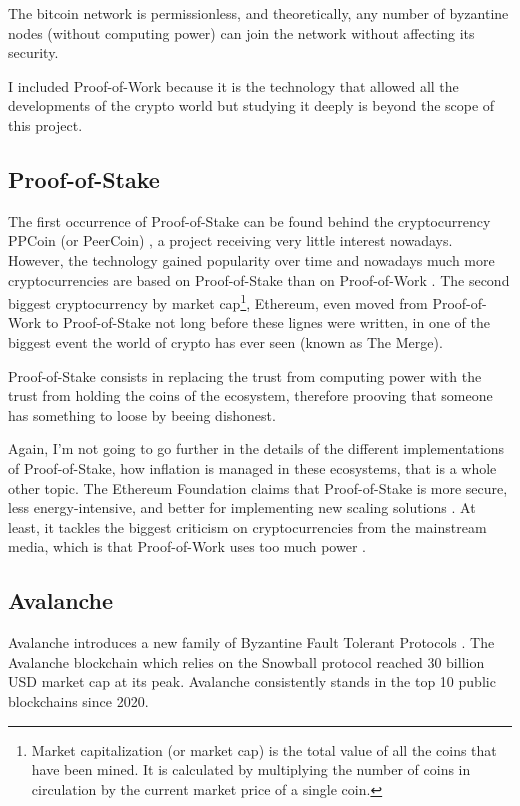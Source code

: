 \documentclass[11pt, twocolumn]{article}
\begin{document}
The bitcoin network is permissionless, and theoretically, any number of byzantine nodes (without computing power) can join the network without affecting its security.

I included Proof-of-Work because it is the technology that allowed all the developments of the crypto world but studying it deeply is beyond the scope of this project.



\subsection{Proof-of-Stake}
The first occurrence of Proof-of-Stake can be found behind the cryptocurrency PPCoin (or PeerCoin) \cite{ppcoin}, a project receiving very little interest nowadays. However, the technology gained popularity over time and nowadays much more cryptocurrencies are based on Proof-of-Stake than on Proof-of-Work \cite{coinmarketcap}. 
The second biggest cryptocurrency by market cap\footnote{Market capitalization (or market cap) is the total value of all the coins that have been mined. It is calculated by multiplying the number of coins in circulation by the current market price of a single coin.}, Ethereum, even moved from Proof-of-Work to Proof-of-Stake not long before these lignes were written, in one of the biggest event the world of crypto has ever seen (known as The Merge).

Proof-of-Stake consists in replacing the trust from computing power with the trust from holding the coins of the ecosystem, therefore prooving that someone has something to loose by beeing dishonest.

Again, I'm not going to go further in the details of the different implementations of Proof-of-Stake, how inflation is managed in these ecosystems, that is a whole other topic. The Ethereum Foundation claims that Proof-of-Stake is more secure, less energy-intensive, and better for implementing new scaling solutions \cite{ethereum}. 
At least, it tackles the biggest criticism on cryptocurrencies from the mainstream media, which is that Proof-of-Work uses too much power \cite{bitcoinUse}.


\subsection{Avalanche}

Avalanche introduces a new family of Byzantine Fault Tolerant Protocols \cite{snowprotocol}. The Avalanche blockchain which relies on the Snowball protocol reached 30 billion USD market cap at its peak. Avalanche consistently stands in the top 10 public blockchains since 2020.
\end{document}
